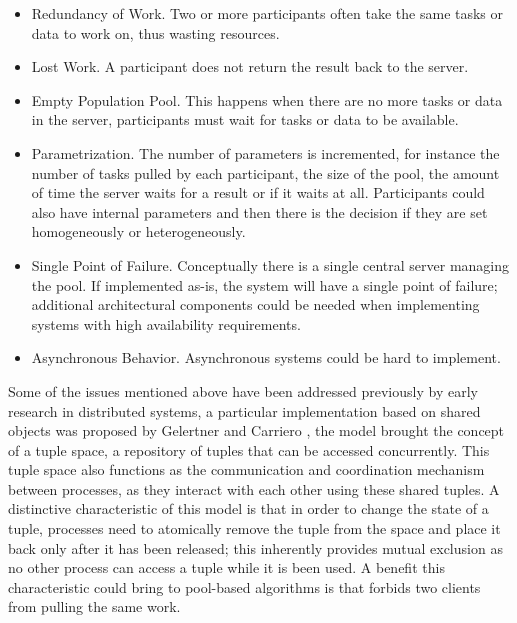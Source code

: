 \begin{itemize}
	\item Redundancy of Work. Two or more participants often take the same tasks or data to work on, thus wasting resources.  
	\item Lost Work. A participant does not return the result back to the server.
	\item Empty Population Pool. This happens when there are no more tasks or data in the server, participants must wait for tasks or data to be available. 
	\item Parametrization. The number of parameters is incremented, for instance the number of tasks pulled by each participant, the size of the pool,   the amount of time the server waits for a result or if it waits at all. Participants could also have internal parameters and then there is the decision if they are set homogeneously or heterogeneously.
	\item Single Point of Failure. Conceptually there is a single central server managing the pool.  If implemented as-is, the system will have a single point of failure; additional architectural components could be needed when implementing systems with high availability requirements.  	
	\item Asynchronous Behavior. Asynchronous systems could be hard to implement.
\end{itemize}
        
Some of the issues mentioned above have been addressed previously by early research in distributed systems, a particular implementation based on shared objects was proposed by Gelertner and Carriero \cite{linda}, the model brought the concept of a tuple space, a repository of tuples that can be accessed concurrently. This tuple space also functions as the communication and coordination mechanism  between processes, as they interact with each other using these shared tuples. A distinctive characteristic of this model is that in order to change the state of a tuple, processes need to atomically remove the tuple from the space and place it back only after it has been released; this inherently provides mutual exclusion as no other process can access a tuple while it is been used. A benefit this characteristic could bring to pool-based algorithms is that forbids two clients from pulling the same work. 

